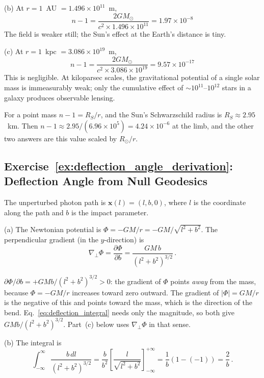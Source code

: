 (b) At $r = 1$~AU $= 1.496 \times 10^{11}$~m,
\[
    n - 1 = \frac{2GM_\odot}{c^2 \times 1.496\!\times\!10^{11}}
    = \boxed{1.97 \times 10^{-8}}
\]
The field is weaker still; the Sun's effect at the Earth's distance is tiny.

(c) At $r = 1$~kpc $= 3.086 \times 10^{19}$~m,
\[
    n - 1 = \frac{2GM_\odot}{c^2 \times 3.086\!\times\!10^{19}}
    = \boxed{9.57 \times 10^{-17}}
\]
This is negligible.  At kiloparsec scales, the gravitational
potential of a single solar mass is immeasurably weak; only the
cumulative effect of $\sim 10^{11}$--$10^{12}$ stars in a galaxy
produces observable lensing.

\begin{annotation}
For a point mass $n - 1 = R_S/r$, and the Sun's Schwarzschild radius is
$R_S \approx 2.95$~km.  Then $n - 1 \approx 2.95/(6.96\times10^5) =
4.24\times10^{-6}$ at the limb, and the other two answers are this value
scaled by $R_\odot/r$.
\end{annotation}


\subsection*{Exercise~\ref{ex:deflection_angle_derivation}: Deflection Angle from Null Geodesics}

The unperturbed photon path is $\mathbf{x}(l) = (l, b, 0)$, where
$l$ is the coordinate along the path and $b$ is the impact parameter.

(a) The Newtonian potential is $\Phi = -GM/r = -GM/\sqrt{l^2 + b^2}$.
The perpendicular gradient (in the $y$-direction) is
\[
    \nabla_\perp \Phi = \frac{\partial \Phi}{\partial b}
    = \frac{GM\, b}{(l^2 + b^2)^{3/2}} \,.
\]

\begin{annotation}
$\partial\Phi/\partial b = +GMb/(l^2 + b^2)^{3/2} > 0$: the gradient of
$\Phi$ points \emph{away} from the mass, because $\Phi = -GM/r$ increases
toward zero outward.  The gradient of $|\Phi| = GM/r$ is the negative of
this and points toward the mass, which is the direction of the bend.
Eq.~\eqref{eq:deflection_integral} needs only the magnitude, so both
give $GMb/(l^2 + b^2)^{3/2}$.  Part~(c) below uses $\nabla_\perp\Phi$ in
that sense.
\end{annotation}


(b) The integral is
\[
    \int_{-\infty}^{\infty} \frac{b\, dl}{(l^2 + b^2)^{3/2}}
    = \frac{b}{b^2} \left[\frac{l}{\sqrt{l^2 + b^2}}\right]_{-\infty}^{+\infty}
    = \frac{1}{b}(1 - (-1)) = \frac{2}{b} \,.
\]


